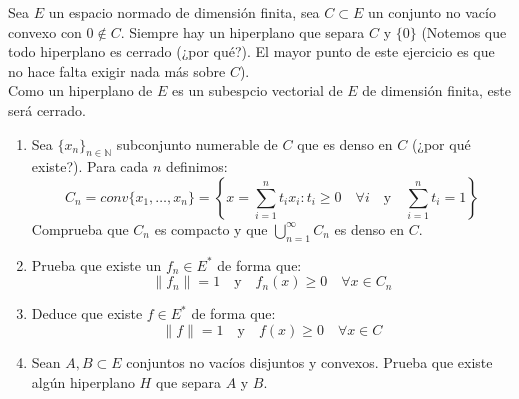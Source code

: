 \begin{ejercicio}%
    Sea $E$ un espacio normado de dimensión finita, sea $C\subset E$ un conjunto no vacío convexo con $0\notin C$. Siempre hay un hiperplano que separa $C$ y $\{0\}$ (Notemos que todo hiperplano es cerrado (¿por qué?). El mayor punto de este ejercicio es que no hace falta exigir nada más sobre $C$).\\

    \noindent
    Como un hiperplano de $E$ es un subespcio vectorial de $E$ de dimensión finita, este será cerrado.

    \begin{enumerate}[label=\alph*)]
        \item Sea $\{x_n\}_{n\in \mathbb{N}}$ subconjunto numerable de $C$ que es denso en $C$ (¿por qué existe?). Para cada $n$ definimos:
            \begin{equation*}
                C_n = conv\{x_1, \ldots, x_n\} = \left\{x=\sum_{i=1}^{n}t_ix_i : t_i\geq 0 \quad \forall i \quad \text{y}\quad \sum_{i=1}^{n}t_i = 1 \right\}
            \end{equation*}
            Comprueba que $C_n$ es compacto y que $\bigcup\limits_{n=1}^\infty C_n$ es denso en $C$.
        \item Prueba que existe un $f_n \in E^\ast$ de forma que:
            \begin{equation*}
                \|f_n\| = 1 \quad \text{y}\quad f_n(x) \geq 0 \quad \forall x\in C_n
            \end{equation*}
        \item Deduce que existe $f\in E^\ast$ de forma que:
            \begin{equation*}
                \|f\| = 1 \quad \text{y}\quad f(x)\geq 0 \quad \forall x\in C
            \end{equation*}
        \item Sean $A,B\subset E$ conjuntos no vacíos disjuntos y convexos. Prueba que existe algún hiperplano $H$ que separa $A$ y $B$.
    \end{enumerate}
\end{ejercicio}

